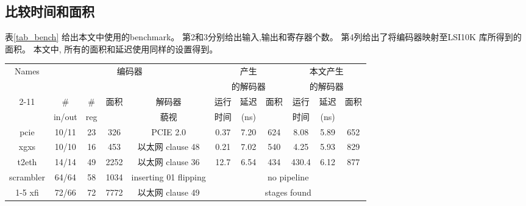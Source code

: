 \subsection{比较时间和面积}
表\ref{tab_bench} 给出本文中使用的benchmark。
第2和3分别给出输入,输出和寄存器个数。
第4列给出了将编码器映射至LSI10K 库所得到的面积。
本文中,
所有的面积和延迟使用同样的设置得到。


\begin{table*}[t]
\caption{Benchmark和实验结果}
\begin{tabular}{|c|c|c|c|c|c|c|c|c|c|c|}
\hline
 Names     & \multicolumn{4}{|c|}{编码器}                                        &   \multicolumn{3}{|c|}{\cite{ShenTCAD11}产生}      &   \multicolumn{3}{|c|}{本文产生} \\
           & \multicolumn{4}{|c|}{}                                              &   \multicolumn{3}{|c|}{的解码器}                   &   \multicolumn{3}{|c|}{的解码器} \\\cline{2-11}
           &    \#   &   \#    &面积  & 解码器                                   &运行 &延迟 &面积                                    &运行 &延迟 &面积\\
           & in/out  &  reg    &      &   藐视                                   &时间 &(ns) &                                        &时间 &(ns) &    \\\hline\hline
 pcie      & 10/11   & 23      & 326  &PCIE 2.0 \cite{pcie21}                    &0.37 &7.20 &624                                     &8.08 & 5.89&652 \\\hline
 xgxs      & 10/10   & 16      & 453  &     以太网   clause 48 \cite{IEEE8023_S4}&0.21 &7.02 &540                                     &4.25 & 5.93&829 \\\hline
 t2eth     & 14/14   & 49      & 2252 &    以太网   clause 36 \cite{IEEE8023_S4} &12.7 &6.54 &434                                     &430.4& 6.12&877 \\\hline
scrambler  &64/64    & 58      & 1034 & inserting 01 flipping                    &     \multicolumn{6}{|c|}{no pipeline }\\\cline{1-5}
 xfi       & 72/66   & 72      & 7772 &     以太网   clause 49 \cite{IEEE8023_S4}&     \multicolumn{6}{|c|}{stages found}\\\hline
\end{tabular}\label{tab_bench}
\end{table*}






